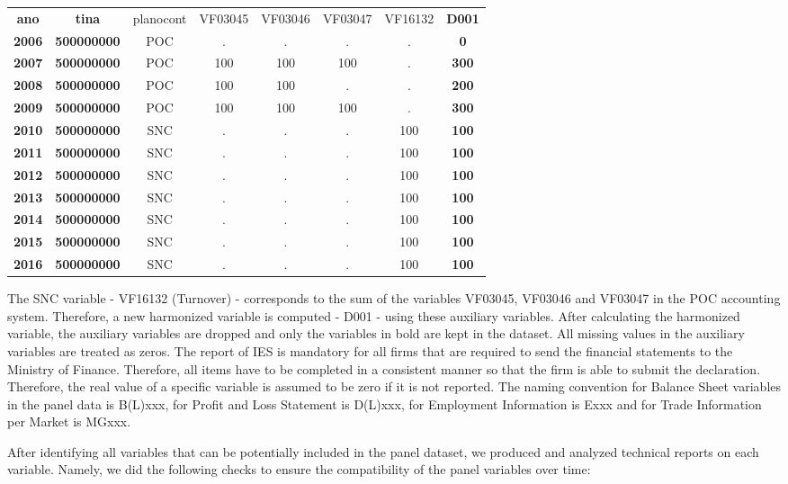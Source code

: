 \documentclass[]{book}
\begin{document}
\begin{longtable}[]{@{}cccccccc@{}}
\toprule
\endhead
\textbf{ano} & \textbf{tina} & planocont & VF03045 & VF03046 & VF03047 & VF16132 & \textbf{D001}\tabularnewline
\textbf{2006} & \textbf{500000000} & POC & . & . & . & . & \textbf{0}\tabularnewline
\textbf{2007} & \textbf{500000000} & POC & 100 & 100 & 100 & . & \textbf{300}\tabularnewline
\textbf{2008} & \textbf{500000000} & POC & 100 & 100 & . & . & \textbf{200}\tabularnewline
\textbf{2009} & \textbf{500000000} & POC & 100 & 100 & 100 & . & \textbf{300}\tabularnewline
\textbf{2010} & \textbf{500000000} & SNC & . & . & . & 100 & \textbf{100}\tabularnewline
\textbf{2011} & \textbf{500000000} & SNC & . & . & . & 100 & \textbf{100}\tabularnewline
\textbf{2012} & \textbf{500000000} & SNC & . & . & . & 100 & \textbf{100}\tabularnewline
\textbf{2013} & \textbf{500000000} & SNC & . & . & . & 100 & \textbf{100}\tabularnewline
\textbf{2014} & \textbf{500000000} & SNC & . & . & . & 100 & \textbf{100}\tabularnewline
\textbf{2015} & \textbf{500000000} & SNC & . & . & . & 100 & \textbf{100}\tabularnewline
\textbf{2016} & \textbf{500000000} & SNC & . & . & . & 100 & \textbf{100}\tabularnewline
\bottomrule
\end{longtable}

The SNC variable - VF16132 (Turnover) - corresponds to the sum of the variables VF03045, VF03046 and VF03047 in the POC accounting system. Therefore, a new harmonized variable is computed - D001 - using these auxiliary variables. After calculating the harmonized variable, the auxiliary variables are dropped and only the variables in bold are kept in the dataset.
All missing values in the auxiliary variables are treated as zeros. The report of IES is mandatory for all firms that are required to send the financial statements to the Ministry of Finance. Therefore, all items have to be completed in a consistent manner so that the firm is able to submit the declaration. Therefore, the real value of a specific variable is assumed to be zero if it is not reported.
The naming convention for Balance Sheet variables in the panel data is B(L)xxx, for Profit and Loss Statement is D(L)xxx, for Employment Information is Exxx and for Trade Information per Market is MGxxx.

After identifying all variables that can be potentially included in the panel dataset, we produced and analyzed technical reports on each variable. Namely, we did the following checks to ensure the compatibility of the panel variables over time:
\end{document}
